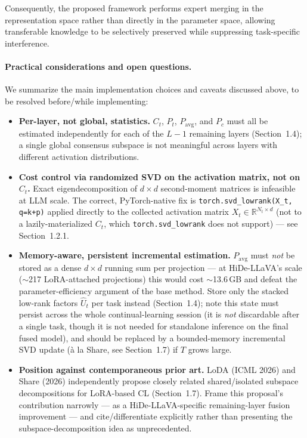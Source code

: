 \documentclass[a4paper]{article}
\begin{document}
Consequently, the proposed framework performs expert merging in the representation space rather than directly in the parameter space, allowing transferable knowledge to be selectively preserved while suppressing task-specific interference.

\paragraph{Practical considerations and open questions.} We summarize the main implementation choices and caveats discussed above, to be resolved before/while implementing:
\begin{itemize}
\item \textbf{Per-layer, not global, statistics.} $C_t$, $P_t$, $P_{\mathrm{avg}}$, and $P_c$ must all be estimated independently for each of the $L-1$ remaining layers (Section~1.4); a single global consensus subspace is not meaningful across layers with different activation distributions.
\item \textbf{Cost control via randomized SVD on the activation matrix, not on $C_t$.} Exact eigendecomposition of $d\times d$ second-moment matrices is infeasible at LLM scale. The correct, PyTorch-native fix is \texttt{torch.svd\_lowrank(X\_t, q=k+p)} applied directly to the collected activation matrix $X_t\in\mathbb{R}^{N_t\times d}$ (not to a lazily-materialized $C_t$, which \texttt{torch.svd\_lowrank} does not support) — see Section~1.2.1.
\item \textbf{Memory-aware, persistent incremental estimation.} $P_{\mathrm{avg}}$ must \emph{not} be stored as a dense $d\times d$ running sum per projection — at HiDe-LLaVA's scale ($\sim$217 LoRA-attached projections) this would cost $\sim$13.6\,GB and defeat the parameter-efficiency argument of the base method. Store only the stacked low-rank factors $\hat U_t$ per task instead (Section~1.4); note this state must persist across the whole continual-learning session (it is \emph{not} discardable after a single task, though it is not needed for standalone inference on the final fused model), and should be replaced by a bounded-memory incremental SVD update (à la Share, see Section~1.7) if $T$ grows large.
\item \textbf{Position against contemporaneous prior art.} LoDA (ICML 2026) and Share (2026) independently propose closely related shared/isolated subspace decompositions for LoRA-based CL (Section~1.7). Frame this proposal's contribution narrowly — as a HiDe-LLaVA-specific remaining-layer fusion improvement — and cite/differentiate explicitly rather than presenting the subspace-decomposition idea as unprecedented.

\end{itemize}
\end{document}
